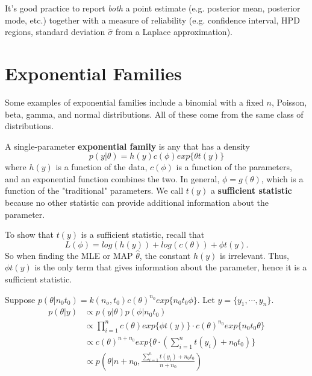 \documentclass[titlepage, 12pt, leqno]{article}
\begin{document}
\begin{note}
    It's good practice to report \textit{both} a point estimate (e.g. posterior
    mean, posterior mode, etc.) together with a measure of reliability (e.g.
    confidence interval, HPD regions, standard deviation $\hat\sigma$ from a 
    Laplace approximation).
\end{note}

\pagebreak
\section{Exponential Families}
Some examples of exponential families include a binomial with a fixed $n$, 
Poisson, beta, gamma, and normal distributions. All of these come from the same
class of distributions.

\begin{definition}
    A single-parameter \textbf{exponential family} is any that has a density
    \[
        p(y|\theta) = h(y)c(\phi )exp\{\theta t(y)\}
    \]
    where $h(y)$ is a function of the data, $c(\phi )$ is a function of the
    parameters, and an exponential function combines the two. In general,
    $\phi = g(\theta)$, which is a function of the "traditional" parameters. We 
    call $t(y)$ a \textbf{sufficient statistic} because no other statistic can
    provide additional information about the parameter.
\end{definition}

To show that $t(y)$ is a sufficient statistic, recall that
\[
    L(\phi ) = log(h(y)) + log(c(\theta)) + \phi t(y).
\]
So when finding the MLE or MAP $\hat \theta$, the constant $h(y)$ is irrelevant.
Thus, $\phi t(y)$ is the only term that gives information about the parameter, 
hence it is a sufficient statistic.

Suppose $p(\theta|n_{0}t_{0}) = k(n_{o}, t_{0})c(\theta)^{n_{0}}exp\{n_{0}t_{0}
\phi\}$. Let $y = \{y_{1}, \cdots , y_{n}\}$.
\begin{align*}
    p(\theta|y) &\propto p(y|\theta)p(\phi |n_{0}t_{0}) \\
                &\propto \prod_{i=1}^{n}c(\theta)exp\{\phi t(y)\} \cdot 
                c(\theta) ^{n_{0}}exp\{n_{0}t_{0}\theta\} \\
                &\propto c(\theta)^{n+n_{0}}exp\{\theta \cdot \left(
                    \sum_{i=1}^{n}t(y_{i})+n_{0}t_{0}\right)\} \\
                &\propto p\left(\theta | n+n_{0}, \frac{
                    \sum_{i=1}^{n}t(y_{i}) + n_{0}t_{0}}{n+n_{0}}\right)
\end{align*}
\end{document}
